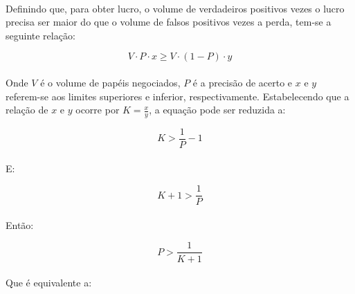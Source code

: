 \documentclass[grad,numbers]{coppe}
\begin{document}
                \paragraph{}Definindo que, para obter lucro, o volume de verdadeiros positivos vezes o lucro precisa ser maior do que o volume de falsos positivos vezes a perda, tem-se a seguinte relação:
                
                \begin{equation}
                    V \cdot P \cdot x \geq V \cdot (1 - P) \cdot y
                \end{equation}
                
                \paragraph{}Onde $V$ é o volume de papéis negociados, $P$ é a precisão de acerto e $x$ e $y$ referem-se aos limites superiores e inferior, respectivamente. Estabelecendo que a relação de $x$ e $y$ ocorre por $K = \frac{x}{y}$, a equação pode ser reduzida a:
                
                \begin{equation}
                    K > \frac{1}{P} - 1
                \end{equation}
                
                \paragraph{}E:
                
                \begin{equation}
                    K + 1 > \frac{1}{P}                    
                \end{equation}
                
                \paragraph{}Então:
                
                \begin{equation}
                    P > \frac{1}{K + 1}
                \end{equation}
                
                \paragraph{}Que é equivalente a:
                
\end{document}
